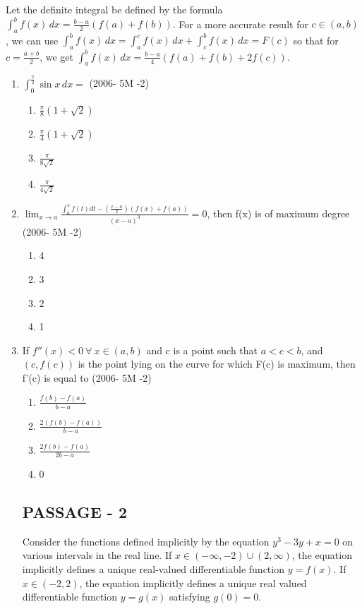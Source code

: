 \documentclass[journal,12pt,twocolumn]{IEEEtran}
\theoremstyle{remark}
\begin{document}
Let the definite integral be defined by the formula
$\int_a^b f(x) \, dx = \frac{b-a}{2} ( f(a) + f(b) ).$
For a more accurate result for \( c \in (a, b) \), we can use
$\int_a^b f(x) \, dx = \int_a^c f(x) \, dx + \int_c^b f(x) \, dx = F(c)$
so that for \( c = \frac{a+b}{2} \), we get
$\int_a^b f(x) \, dx = \frac{b-a}{4}( f(a) + f(b) + 2f(c) )$.
\begin{enumerate}
\item $\int_0^{\frac{\pi}{2}} \sin x \, dx =$
\hfill{(2006- 5M -2)}
\begin{enumerate}[label=(\alph*)]
    \item $ \frac{\pi}{8} ( 1 + \sqrt{2} ) $
    \item $\frac{\pi}{4} ( 1 + \sqrt{2} ) $
    \item $ \frac{\pi}{8\sqrt{2}}$
    \item  $\frac{\pi}{4\sqrt{2}}$ 
\end{enumerate}
\item $\lim_{x \to a} \frac{\int_a^x f(t)dt - (\frac{x-a}{2})(f(x) + f(a))}{(x - a)^3} = 0 $, then  f(x)  is 
 of maximum degree 
 \hfill{(2006- 5M -2)}
 \begin{enumerate}[label=(\alph*)]
    \item  4 
    \item  3 
    \item  2 
    \item  1
  \end{enumerate}
 \item If $ f''(x) < 0 \ \forall \ x \in (a, b) $ and  c  is a point such that $a < c < b $, and $(c, f(c))$ is the point lying on the curve for which F(c) is maximum, then f'(c) is equal to
 \hfill{(2006- 5M -2)}
 \begin{enumerate}[label=(\alph*)]
    \item  $\frac{f(b) - f(a)}{b - a} $
    \item  $ \frac{2(f(b) - f(a))}{b - a} $
    \item  $ \frac{2f(b) - f(a)}{2b - a} $
    \item  0
\end{enumerate}
\subsection{PASSAGE - 2}
 
 Consider the functions defined implicitly by the equation 
$y^3 - 3y + x = 0$
on various intervals in the real line. If $ x \in (-\infty, -2) \cup (2, \infty) $, the equation implicitly defines a unique real-valued differentiable function $ y = f(x) $. If $x \in (-2, 2)$, the equation implicitly defines a unique real valued differentiable function $y = g(x)$ satisfying $ g(0) = 0$.


\end{enumerate}
\end{document}

